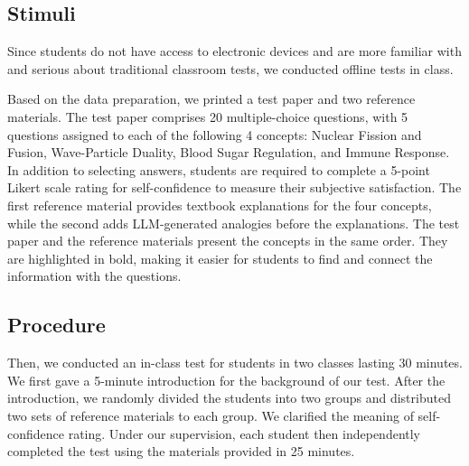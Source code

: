 \subsection{Stimuli}
\label{sec:study1_stimuli}
Since students do not have access to electronic devices and are more familiar with and serious about traditional classroom tests, we conducted offline tests in class.

Based on the data preparation, we printed a test paper and two reference materials. 
The test paper comprises 20 multiple-choice questions, with 5 questions assigned to each of the following 4 concepts: Nuclear Fission and Fusion, Wave-Particle Duality, Blood Sugar Regulation, and Immune Response. 
In addition to selecting answers, students are required to complete a 5-point Likert scale rating for self-confidence to measure their subjective satisfaction.
The first reference material provides textbook explanations for the four concepts, while the second adds LLM-generated analogies before the explanations.
The test paper and the reference materials present the concepts in the same order. 
They are highlighted in bold, making it easier for students to find and connect the information with the questions.

\subsection{Procedure}
Then, we conducted an in-class test for students in two classes lasting 30 minutes. 
We first gave a 5-minute introduction for the background of our test.
After the introduction, we randomly divided the students into two groups and distributed two sets of reference materials to each group. 
We clarified the meaning of self-confidence rating. 
Under our supervision, each student then independently completed the test using the materials provided in 25 minutes.

